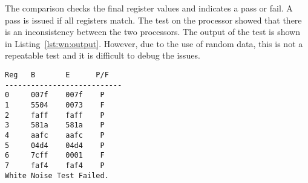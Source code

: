 The comparison checks the final register values and indicates a pass or fail. 
A pass is issued if all registers match. 
The test on the processor showed that there is an inconsistency between the two processors. 
The output of the test is shown in Listing~\ref{lst:wn:output}.
However, due to the use of random data, this is not a repeatable test and it is difficult to debug the issues. 

%

\begin{lstlisting}[label=lst:wn:output,caption={Output of the white noise test}]
Reg   B       E      P/F
---------------------------
0     007f    007f    P
1     5504    0073    F
2     faff    faff    P
3     581a    581a    P
4     aafc    aafc    P
5     04d4    04d4    P
6     7cff    0001    F
7     faf4    faf4    P
White Noise Test Failed.
\end{lstlisting}

